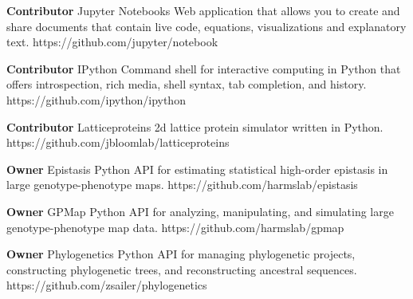 \begin{cvossoftware}

  \cvoss
    {\textbf{Contributor} Jupyter Notebooks} %
    {Web application that allows you to create and share documents that contain live code, equations, visualizations and explanatory text.} %
    {https://github.com/jupyter/notebook} %

  \cvoss
    {\textbf{Contributor} IPython} %
    {Command shell for interactive computing in Python that offers introspection, rich media, shell syntax, tab completion, and history.}
    {https://github.com/ipython/ipython} %

  \cvoss
    {\textbf{Contributor} Latticeproteins} %
    {2d lattice protein simulator written in Python.}
    {https://github.com/jbloomlab/latticeproteins} %

  \cvoss
    {\textbf{Owner} Epistasis} %
    {Python API for estimating statistical high-order epistasis in large genotype-phenotype maps.}
    {https://github.com/harmslab/epistasis} %

  \cvoss
    {\textbf{Owner} GPMap} %
    {Python API for analyzing, manipulating, and simulating large genotype-phenotype map data.}
    {https://github.com/harmslab/gpmap} %

  \cvoss
    {\textbf{Owner} Phylogenetics} %
    {Python API for managing phylogenetic projects, constructing phylogenetic trees, and reconstructing ancestral sequences.}
    {https://github.com/zsailer/phylogenetics} %

\end{cvossoftware}
